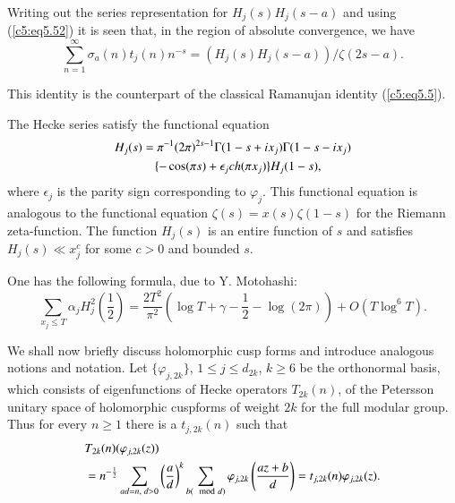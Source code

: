 Writing out the series representation for $H_j (s) H_j(s-a)$ and using
(\ref{c5:eq5.52}) it is seen that, in the region of absolute
convergence, we have  
\begin{equation}
\sum\limits^\infty_{n=1} \sigma_a(n) t_j(n) n^{-s} = (H_j(s) H_j
(s-a)) / \zeta (2s-a). \label{c5:eq5.53} 
\end{equation}

This identity is the counterpart of the classical Ramanujan identity
(\ref{c5:eq5.5}).  

The Hecke series satisfy the functional equation 
\begin{align}
H_j(s) &= \pi^{-1} (2\pi)^{2s-1} \Gamma(1-s+ix_j) \Gamma
(1-s-ix_j)\notag\\  
&\quad\{-\cos (\pi s) + \epsilon_j ch (\pi x_j) \}
H_j(1-s),\label{c5:eq5.54} 
\end{align}
where $\epsilon_j$ is the parity sign corresponding to
$\varphi_j$. This functional equation is analogous to the functional
equation $\zeta(s) = x(s) \zeta(1-s)$ for the Riemann
zeta-function. The function $H_j(s)$ is an entire function of $s$ and
satisfies $H_j (s) \ll x^c_j$ for some $c>0$ and bounded $s$. 

One has the following formula, due to Y. Motohashi:
\begin{equation} 
\sum\limits_{x_j\leq T} \alpha_j H^2_j \left(\frac{1}{2} \right) =
\frac{2T^2}{\pi^2} \left(\log T + \gamma - \frac{1}{2} - \log
(2\pi)\right) + O(T \log^6 T). \label{c5:eq5.55} 
\end{equation}

We shall now briefly discuss holomorphic cusp forms and introduce
analogous notions and notation. Let $\{\varphi_{j,2k}\}$, $1 \leq j
\leq d_{2k}$, $k \geq 6$ be the orthonormal basis, which consists of
eigenfunctions of Hecke operators $T_{2k}(n)$, of the Petersson
unitary space of holomorphic cusp\pageoriginale forms of weight $2k$
for the full modular group. Thus for every $n \geq 1$ there is a
$t_{j,2k} (n)$ such that 
\begin{align}
& T_{2k} (n) (\varphi_{j,2k} (z))  \label{c5:eq5.56}\\
& = n^{-\frac{1}{2}} \sum\limits_{ad = n, \; d > 0} \left(\frac{a}{d}
  \right)^k \sum\limits_{b(\mod d)} \varphi_{j,2k}
  \left(\frac{az+b}{d} \right) = t_{j,2k}(n) \varphi_{j,2k} (z).\notag 
\end{align}

